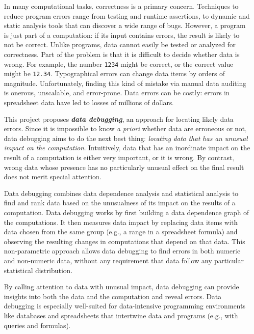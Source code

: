 \projectname{}

In many computational tasks, correctness is a primary
concern. Techniques to reduce program errors range from testing and
runtime assertions, to dynamic and static analysis tools that can
discover a wide range of bugs. However, a program is just part of
a computation: if its input contains errors, the result
is likely to not be correct. Unlike programs, data
cannot easily be tested or analyzed for correctness.  Part of the
problem is that it is difficult to decide whether data
is wrong. For example, the number \texttt{1234}
might be correct, or the correct value might
be \texttt{12.34}. Typographical errors can change data items by
orders of magnitude. Unfortunately, finding this kind of mistake via
manual data auditing is onerous, unscalable, and error-prone. Data
errors can be costly: errors in spreadsheet data have led to losses of
millions of dollars.

This project proposes \emph{\bf data debugging}, an approach for
locating likely data errors. Since it is impossible to know \emph{a
priori} whether data are erroneous or not, data debugging aims to do
the next best thing: \emph{locating data that has an unusual impact on
the computation}. Intuitively, data that has an inordinate impact on
the result of a computation is either very important, or it is wrong. By
contrast, wrong data whose presence has no particularly unusual effect
on the final result does not merit special attention.

Data debugging combines data dependence analysis and statistical
analysis to find and rank data based on the unusualness of its impact
on the results of a computation. Data debugging works by first
building a data dependence graph of the computations. It then measures
data impact by replacing data items with data chosen from the same
group (e.g., a range in a spreadsheet formula) and observing the
resulting changes in computations that depend on that data. This
non-parametric approach allows data debugging to find errors in both
numeric and non-numeric data, without any requirement that data follow
any particular statistical distribution.

By calling attention to data with unusual impact, data debugging can
provide insights into both the data and the computation and reveal
errors. Data debugging is especially well-suited for data-intensive
programming environments like databases and spreadsheets that
intertwine data and programs (e.g., with queries and formulas). 

